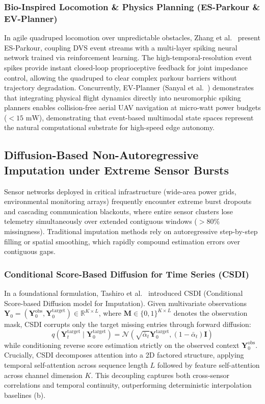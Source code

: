 \subsubsection{Bio-Inspired Locomotion \& Physics Planning (ES-Parkour \& EV-Planner)}
In agile quadruped locomotion over unpredictable obstacles, Zhang et al.~\cite{Zhang2025ESParkour} present ES-Parkour, coupling DVS event streams with a multi-layer spiking neural network trained via reinforcement learning. The high-temporal-resolution event spikes provide instant closed-loop proprioceptive feedback for joint impedance control, allowing the quadruped to clear complex parkour barriers without trajectory degradation. Concurrently, EV-Planner (Sanyal et al.~\cite{Sanyal2023EVPlanner}) demonstrates that integrating physical flight dynamics directly into neuromorphic spiking planners enables collision-free aerial UAV navigation at micro-watt power budgets ($<15\text{ mW}$), demonstrating that event-based multimodal state spaces represent the natural computational substrate for high-speed edge autonomy.

\subsection{Diffusion-Based Non-Autoregressive Imputation under Extreme Sensor Bursts}
\label{sec:diffusion_burst_imputation}
Sensor networks deployed in critical infrastructure (wide-area power grids, environmental monitoring arrays) frequently encounter extreme burst dropouts and cascading communication blackouts, where entire sensor clusters lose telemetry simultaneously over extended contiguous windows ($>80\%$ missingness). Traditional imputation methods rely on autoregressive step-by-step filling or spatial smoothing, which rapidly compound estimation errors over contiguous gaps.

\subsubsection{Conditional Score-Based Diffusion for Time Series (CSDI)}
In a foundational formulation, Tashiro et al.~\cite{Tashiro2021CSDI} introduced CSDI (Conditional Score-based Diffusion model for Imputation). Given multivariate observations $\mathbf{Y}_0 = (\mathbf{Y}_0^{\text{obs}}, \mathbf{Y}_0^{\text{target}}) \in \mathbb{R}^{K \times L}$, where $\mathbf{M} \in \{0, 1\}^{K \times L}$ denotes the observation mask, CSDI corrupts only the target missing entries through forward diffusion:
\begin{equation}
    q(\mathbf{Y}_t^{\text{target}} \mid \mathbf{Y}_0^{\text{target}}) = \mathcal{N}\left(\sqrt{\bar{\alpha}_t}\mathbf{Y}_0^{\text{target}}, (1 - \bar{\alpha}_t)\mathbf{I}\right)
\end{equation}
while conditioning reverse score estimation strictly on the observed context $\mathbf{Y}_0^{\text{obs}}$. Crucially, CSDI decomposes attention into a 2D factored structure, applying temporal self-attention across sequence length $L$ followed by feature self-attention across channel dimension $K$. This decoupling captures both cross-sensor correlations and temporal continuity, outperforming deterministic interpolation baselines (b).

